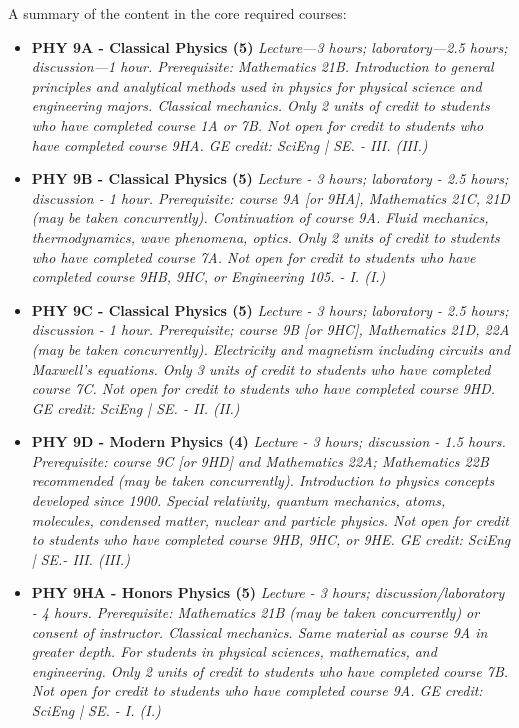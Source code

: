 \documentclass[12pt]{article}
\begin{document}
A summary of the content in the core required courses:
\begin{itemize}

\item {\bf PHY 9A - Classical Physics (5)}
{\it Lecture—3 hours; laboratory—2.5 hours; discussion—1 hour. Prerequisite: Mathematics 21B. Introduction to general principles and analytical methods used in physics for physical science and engineering majors. Classical mechanics. Only 2 units of credit to students who have completed course 1A or 7B. Not open for credit to students who have completed course 9HA. GE credit: SciEng | SE. - III. (III.)}

\item {\bf PHY 9B - Classical Physics (5)}
{\it Lecture - 3 hours; laboratory - 2.5 hours; discussion - 1 hour. Prerequisite: course 9A [or 9HA], Mathematics 21C, 21D (may be taken concurrently). Continuation of course 9A. Fluid mechanics, thermodynamics, wave phenomena, optics. Only 2 units of credit to students who have completed course 7A. Not open for credit to students who have completed course 9HB, 9HC, or Engineering 105. - I. (I.)}

\item {\bf PHY 9C - Classical Physics (5)}
{\it Lecture - 3 hours; laboratory - 2.5 hours; discussion - 1 hour. Prerequisite; course 9B [or 9HC], Mathematics 21D, 22A (may be taken concurrently). Electricity and magnetism including circuits and Maxwell’s equations. Only 3 units of credit to students who have completed course 7C. Not open for credit to students who have completed course 9HD. GE credit: SciEng | SE. - II. (II.)}

\item {\bf PHY 9D - Modern Physics (4)}
{\it Lecture - 3 hours; discussion - 1.5 hours. Prerequisite: course 9C [or 9HD] and Mathematics 22A; Mathematics 22B recommended (may be taken concurrently). Introduction to physics concepts developed since 1900. Special relativity, quantum mechanics, atoms, molecules, condensed matter, nuclear and particle physics. Not open for credit to students who have completed course 9HB, 9HC, or 9HE. GE credit: SciEng | SE.- III. (III.)}

\item {\bf PHY 9HA - Honors Physics (5)}
{\it Lecture - 3 hours; discussion/laboratory - 4 hours. Prerequisite: Mathematics 21B (may be taken concurrently) or consent of instructor. Classical mechanics. Same material as course 9A in greater depth. For students in physical sciences, mathematics, and engineering. Only 2 units of credit to students who have completed course 7B. Not open for credit to students who have completed course 9A. GE credit: SciEng | SE. - I. (I.)}


\end{itemize}
\end{document}
